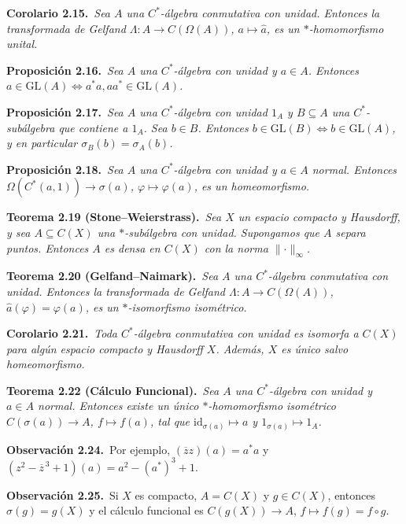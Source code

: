 \documentclass[11pt]{article}
\newcommand{\GL}{\mathrm{GL}}
\newcommand{\id}{\mathrm{id}}
\newenvironment{teorema}[1]{\par\medskip\noindent\textbf{Teorema #1.}\ \itshape}{\par\medskip}
\newenvironment{proposicion}[1]{\par\medskip\noindent\textbf{Proposición #1.}\ \itshape}{\par\medskip}
\newenvironment{corolario}[1]{\par\medskip\noindent\textbf{Corolario #1.}\ \itshape}{\par\medskip}
\newenvironment{observacion}[1]{\par\medskip\noindent\textbf{Observación #1.}\ }{\par\medskip}
\begin{document}
\begin{corolario}{2.15}Sea $A$ una $C^*$-álgebra conmutativa con unidad. Entonces la transformada de Gelfand $\Lambda:A\to C(\Omega(A))$, $a\mapsto\widehat a$, es un $*$-homomorfismo unital.\end{corolario}
\begin{proposicion}{2.16}Sea $A$ una $C^*$-álgebra con unidad y $a\in A$. Entonces $a\in\GL(A)\Longleftrightarrow a^*a,aa^*\in\GL(A)$.\end{proposicion}
\begin{proposicion}{2.17}Sea $A$ una $C^*$-álgebra con unidad $1_A$ y $B\subseteq A$ una $C^*$-subálgebra que contiene a $1_A$. Sea $b\in B$. Entonces $b\in\GL(B)\Longleftrightarrow b\in\GL(A)$, y en particular $\sigma_B(b)=\sigma_A(b)$.\end{proposicion}
\begin{proposicion}{2.18}Sea $A$ una $C^*$-álgebra con unidad y $a\in A$ normal. Entonces $\Omega(C^*(a,1))\to\sigma(a)$, $\varphi\mapsto\varphi(a)$, es un homeomorfismo.\end{proposicion}
\begin{teorema}{2.19 (Stone--Weierstrass)}Sea $X$ un espacio compacto y Hausdorff, y sea $A\subseteq C(X)$ una $*$-subálgebra con unidad. Supongamos que $A$ separa puntos. Entonces $A$ es densa en $C(X)$ con la norma $\lVert\cdot\rVert_\infty$.\end{teorema}
\begin{teorema}{2.20 (Gelfand--Naimark)}Sea $A$ una $C^*$-álgebra conmutativa con unidad. Entonces la transformada de Gelfand $\Lambda:A\to C(\Omega(A))$, $\widehat a(\varphi)=\varphi(a)$, es un $*$-isomorfismo isométrico.\end{teorema}
\begin{corolario}{2.21}Toda $C^*$-álgebra conmutativa con unidad es isomorfa a $C(X)$ para algún espacio compacto y Hausdorff $X$. Además, $X$ es único salvo homeomorfismo.\end{corolario}
\begin{teorema}{2.22 (Cálculo Funcional)}Sea $A$ una $C^*$-álgebra con unidad y $a\in A$ normal. Entonces existe un único $*$-homomorfismo isométrico $C(\sigma(a))\to A$, $f\mapsto f(a)$, tal que $\id_{\sigma(a)}\mapsto a$ y $1_{\sigma(a)}\mapsto1_A$.\end{teorema}
\begin{observacion}{2.24}Por ejemplo, $(\overline z z)(a)=a^*a$ y $(z^2-\overline z^{\,3}+1)(a)=a^2-(a^*)^3+1$.\end{observacion}
\begin{observacion}{2.25}Si $X$ es compacto, $A=C(X)$ y $g\in C(X)$, entonces $\sigma(g)=g(X)$ y el cálculo funcional es $C(g(X))\to A$, $f\mapsto f(g)=f\circ g$.\end{observacion}
\end{document}
